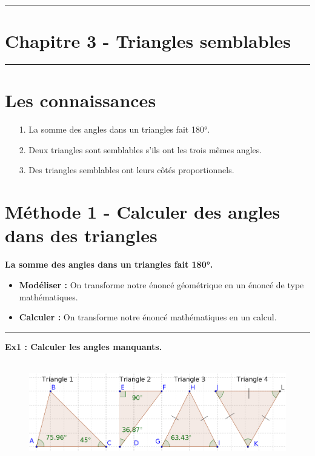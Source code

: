 \documentclass[11pt]{article}
\newcommand{\horrule}[1]{\rule{\linewidth}{#1}} %
\begin{document}
\setlength{\columnseprule}{1pt}

\horrule{2px}
\section*{Chapitre 3 - Triangles semblables}
\horrule{2px}

\section*{Les connaissances}

\begin{enumerate}
  \item[1.] La somme des angles dans un triangles fait 180°.
  \item[2.] Deux triangles sont semblables s'ils ont les trois mêmes angles.
  \item[3.] Des triangles semblables ont leurs côtés proportionnels. 
\end{enumerate}

\section*{Méthode 1 - Calculer des angles dans des triangles}

\textbf{La somme des angles dans un triangles fait 180°.} 

\begin{itemize}
  \item \textbf{Modéliser : } On transforme notre énoncé géométrique en un énoncé de type mathématiques.
  \item \textbf{Calculer : } On transforme notre énoncé mathématiques en un calcul. 
\end{itemize}

\horrule{1px}
\textbf{Ex1 : Calculer les angles manquants.}

\begin{figure}[H]
      \centering
      \includegraphics[width=0.7\linewidth]{4x3-triangles-semblables/m1-calculer-angles-triangles.png}
\end{figure}
\end{document}
